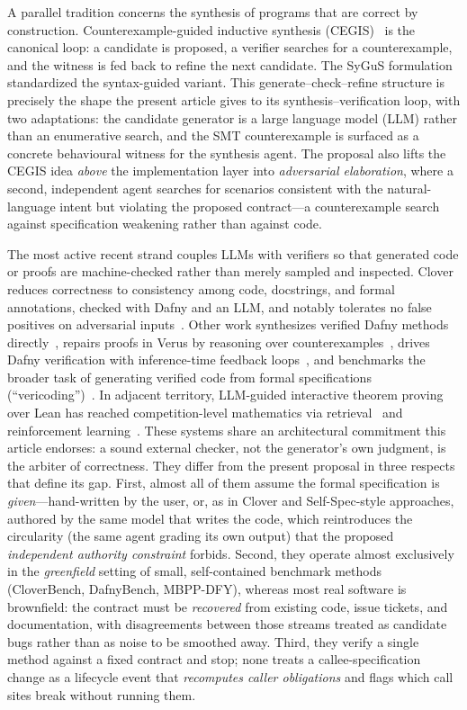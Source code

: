 A parallel tradition concerns the synthesis of programs that are correct by
construction. Counterexample-guided inductive synthesis
(CEGIS)~\cite{solarlezama2006sketching,solarlezama2008thesis} is the canonical
loop: a candidate is proposed, a verifier searches for a counterexample, and
the witness is fed back to refine the next candidate. The SyGuS
formulation~\cite{alur2013sygus} standardized the syntax-guided variant. This
generate--check--refine structure is precisely the shape the present article
gives to its synthesis--verification loop, with two adaptations: the candidate
generator is a large language model (LLM) rather than an enumerative search, and
the SMT counterexample is surfaced as a concrete behavioural witness for the
synthesis agent. The proposal also lifts the CEGIS idea \emph{above} the
implementation layer into \emph{adversarial elaboration}, where a second,
independent agent searches for scenarios consistent with the natural-language
intent but violating the proposed contract---a counterexample search against
specification weakening rather than against code.

The most active recent strand couples LLMs with verifiers so that generated
code or proofs are machine-checked rather than merely sampled and inspected.
Clover reduces correctness to consistency among code, docstrings, and formal
annotations, checked with Dafny and an LLM, and notably tolerates no false
positives on adversarial inputs~\cite{sun2024clover}. Other work synthesizes
verified Dafny methods directly~\cite{misu2024dafny}, repairs proofs in Verus by
reasoning over counterexamples~\cite{yang2025verus}, drives Dafny verification
with inference-time feedback loops~\cite{mugnier2025dafnypro}, and benchmarks the
broader task of generating verified code from formal specifications
(``vericoding'')~\cite{vericoding2026}. In adjacent territory, LLM-guided
interactive theorem proving over Lean has reached competition-level mathematics
via retrieval~\cite{yang2023leandojo} and reinforcement
learning~\cite{deepmind2024alphaproof}. These systems share an architectural
commitment this article endorses: a sound external checker, not the generator's
own judgment, is the arbiter of correctness. They differ from the present
proposal in three respects that define its gap. First, almost all of them assume
the formal specification is \emph{given}---hand-written by the user, or, as in
Clover and Self-Spec-style approaches, authored by the same model that writes
the code, which reintroduces the circularity (the same agent grading its own
output) that the proposed \emph{independent authority constraint} forbids.
Second, they operate almost exclusively in the \emph{greenfield} setting of
small, self-contained benchmark methods (CloverBench, DafnyBench, MBPP-DFY),
whereas most real software is brownfield: the contract must be \emph{recovered}
from existing code, issue tickets, and documentation, with disagreements between
those streams treated as candidate bugs rather than as noise to be smoothed
away. Third, they verify a single method against a fixed contract and stop;
none treats a callee-specification change as a lifecycle event that
\emph{recomputes caller obligations} and flags which call sites break without
running them.


